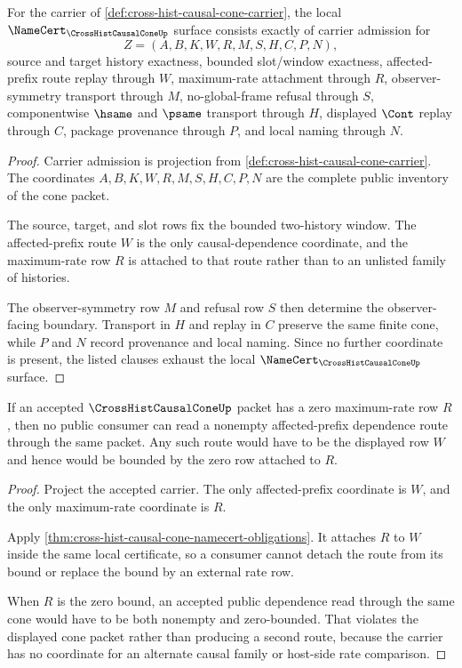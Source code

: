 \begin{theorem}
\label{thm:cross-hist-causal-cone-namecert-obligations}
For the carrier of \autoref{def:cross-hist-causal-cone-carrier}, the local $\NameCert_{\CrossHistCausalConeUp}$ surface consists exactly of carrier admission for
$$
Z=(A,B,K,W,R,M,S,H,C,P,N),
$$
source and target history exactness, bounded slot/window exactness, affected-prefix route replay through $W$, maximum-rate attachment through $R$, observer-symmetry transport through $M$, no-global-frame refusal through $S$, componentwise $\hsame$ and $\psame$ transport through $H$, displayed $\Cont$ replay through $C$, package provenance through $P$, and local naming through $N$.
\end{theorem}
\begin{proof}
Carrier admission is projection from \autoref{def:cross-hist-causal-cone-carrier}. The coordinates $A,B,K,W,R,M,S,H,C,P,N$ are the complete public inventory of the cone packet.

The source, target, and slot rows fix the bounded two-history window. The affected-prefix route $W$ is the only causal-dependence coordinate, and the maximum-rate row $R$ is attached to that route rather than to an unlisted family of histories.

The observer-symmetry row $M$ and refusal row $S$ then determine the observer-facing boundary. Transport in $H$ and replay in $C$ preserve the same finite cone, while $P$ and $N$ record provenance and local naming. Since no further coordinate is present, the listed clauses exhaust the local $\NameCert_{\CrossHistCausalConeUp}$ surface.
\end{proof}

\begin{theorem}
\label{thm:cross-hist-causal-cone-zero-rate-exclusion}
If an accepted $\CrossHistCausalConeUp$ packet has a zero maximum-rate row $R$, then no public consumer can read a nonempty affected-prefix dependence route through the same packet. Any such route would have to be the displayed row $W$ and hence would be bounded by the zero row attached to $R$.
\end{theorem}
\begin{proof}
Project the accepted carrier. The only affected-prefix coordinate is $W$, and the only maximum-rate coordinate is $R$.

Apply \autoref{thm:cross-hist-causal-cone-namecert-obligations}. It attaches $R$ to $W$ inside the same local certificate, so a consumer cannot detach the route from its bound or replace the bound by an external rate row.

When $R$ is the zero bound, an accepted public dependence read through the same cone would have to be both nonempty and zero-bounded. That violates the displayed cone packet rather than producing a second route, because the carrier has no coordinate for an alternate causal family or host-side rate comparison.
\end{proof}

